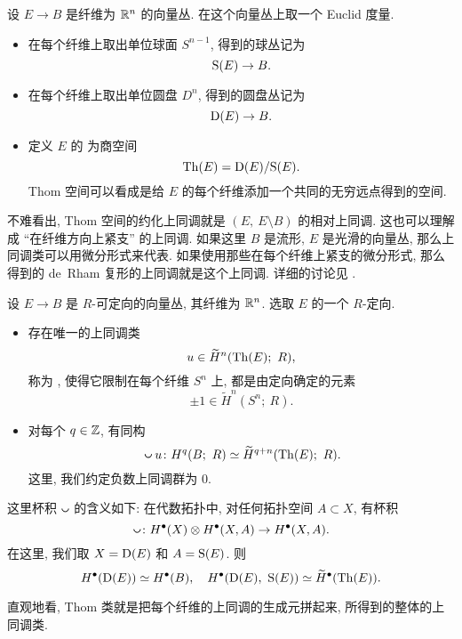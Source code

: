 \begin{definition}
    设 $E \to B$ 是纤维为 $\mathbb{R}^n$ 的向量丛.
    在这个向量丛上取一个 Euclid 度量.
    \begin{itemize}
        \item
            在每个纤维上取出单位球面 $S^{n - 1}$, 得到的球丛记为
            \[ \mathrm{S}(E) \to B. \]
        \item
            在每个纤维上取出单位圆盘 $D^n$, 得到的圆盘丛记为
            \[ \mathrm{D}(E) \to B. \]
        \item
            定义 $E$ 的 为商空间
            \[ \mathrm{Th}(E) = \mathrm{D}(E) / \mathrm{S}(E). \]
            Thom 空间可以看成是给 $E$ 的每个纤维添加一个共同的无穷远点得到的空间.
    \end{itemize}
\end{definition}

不难看出, Thom 空间的约化上同调就是 $(E,\ E \setminus B)$ 的相对上同调.
这也可以理解成 ``在纤维方向上紧支'' 的上同调.
如果这里 $B$ 是流形, $E$ 是光滑的向量丛,
那么上同调类可以用微分形式来代表.
如果使用那些在每个纤维上紧支的微分形式, 
那么得到的 de~Rham 复形的上同调就是这个上同调.
详细的讨论见 \cite{bott-tu}.

\begin{theorem}[Thom 同构] \label{thm-2-thom}
    设 $E \to B$ 是 $R$-可定向的向量丛, 其纤维为 $\mathbb{R}^n$.
    选取 $E$ 的一个 $R$-定向.
    \begin{itemize}
        \item
            存在唯一的上同调类
            \[ u \in \widetilde{H}^n(\mathrm{Th}(E);\ R), \]
            称为 , 使得它限制在每个纤维 $S^n$ 上, 都是由定向确定的元素
            \[ \pm 1 \in \widetilde{H}^n(S^n;\ R). \]
        \item 
            对每个 $q \in \mathbb{Z}$, 有同构
            \[ {} \smallcup u \: H^q (B;\ R) \simeq \widetilde{H}^{q+n} (\Th(E);\ R). \]
            这里, 我们约定负数上同调群为 $0$.
    \end{itemize}
\end{theorem}

这里杯积 $\smallcup$ 的含义如下:
在代数拓扑中, 对任何拓扑空间 $A \subset X$, 有杯积
\[ \smallcup \: H^\bullet(X) \otimes H^\bullet(X,A) \to H^\bullet(X,A). \]
在这里, 我们取 $X = \mathrm{D}(E)$ 和 $A = \mathrm{S}(E)$. 则
\[ H^\bullet(\mathrm{D}(E)) \simeq H^\bullet(B), \quad
    H^\bullet(\mathrm{D}(E),\ \mathrm{S}(E)) \simeq \widetilde{H}^\bullet(\mathrm{Th}(E)). \]

直观地看, Thom 类就是把每个纤维的上同调的生成元拼起来,
所得到的整体的上同调类.

